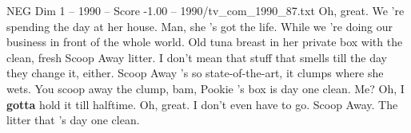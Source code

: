 \begin{textsample}{NEG Dim 1 – 1990 – Score -1.00 – 1990/tv\_com\_1990\_87.txt}  \label{ex:f1_neg_048}
Oh, great.
We 're spending the day at her house.
Man, she 's got the life.
While we 're doing our business in front of the whole world.
Old tuna breast in her private box with the clean, fresh Scoop Away litter.
I don't mean that stuff that smells till the day they change it, either.
Scoop Away 's so state-of-the-art, it clumps where she wets.
You scoop away the clump, bam, Pookie 's box is day one clean.
Me?
Oh, I \textbf{gotta} hold it till halftime.
Oh, great.
I don't even have to go.
Scoop Away.
The litter that 's day one clean.

\end{textsample}
